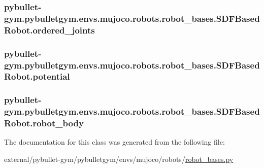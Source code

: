 \subsubsection[{\texorpdfstring{ordered\+\_\+joints}{ordered_joints}}]{\setlength{\rightskip}{0pt plus 5cm}pybullet-\/gym.\+pybulletgym.\+envs.\+mujoco.\+robots.\+robot\+\_\+bases.\+S\+D\+F\+Based\+Robot.\+ordered\+\_\+joints}\hypertarget{classpybullet-gym_1_1pybulletgym_1_1envs_1_1mujoco_1_1robots_1_1robot__bases_1_1_s_d_f_based_robot_a1fc7945d23bc452fce1760101d6feb25}{}\label{classpybullet-gym_1_1pybulletgym_1_1envs_1_1mujoco_1_1robots_1_1robot__bases_1_1_s_d_f_based_robot_a1fc7945d23bc452fce1760101d6feb25}
\subsubsection[{\texorpdfstring{potential}{potential}}]{\setlength{\rightskip}{0pt plus 5cm}pybullet-\/gym.\+pybulletgym.\+envs.\+mujoco.\+robots.\+robot\+\_\+bases.\+S\+D\+F\+Based\+Robot.\+potential}\hypertarget{classpybullet-gym_1_1pybulletgym_1_1envs_1_1mujoco_1_1robots_1_1robot__bases_1_1_s_d_f_based_robot_ac97db793615ab6847ec4318bd46ca5aa}{}\label{classpybullet-gym_1_1pybulletgym_1_1envs_1_1mujoco_1_1robots_1_1robot__bases_1_1_s_d_f_based_robot_ac97db793615ab6847ec4318bd46ca5aa}
\subsubsection[{\texorpdfstring{robot\+\_\+body}{robot_body}}]{\setlength{\rightskip}{0pt plus 5cm}pybullet-\/gym.\+pybulletgym.\+envs.\+mujoco.\+robots.\+robot\+\_\+bases.\+S\+D\+F\+Based\+Robot.\+robot\+\_\+body}\hypertarget{classpybullet-gym_1_1pybulletgym_1_1envs_1_1mujoco_1_1robots_1_1robot__bases_1_1_s_d_f_based_robot_aa0dc7cb4e35ba7d98ec006916519959e}{}\label{classpybullet-gym_1_1pybulletgym_1_1envs_1_1mujoco_1_1robots_1_1robot__bases_1_1_s_d_f_based_robot_aa0dc7cb4e35ba7d98ec006916519959e}


The documentation for this class was generated from the following file\+:\begin{DoxyCompactItemize}
\item 
external/pybullet-\/gym/pybulletgym/envs/mujoco/robots/\hyperlink{mujoco_2robots_2robot__bases_8py}{robot\+\_\+bases.\+py}\end{DoxyCompactItemize}
